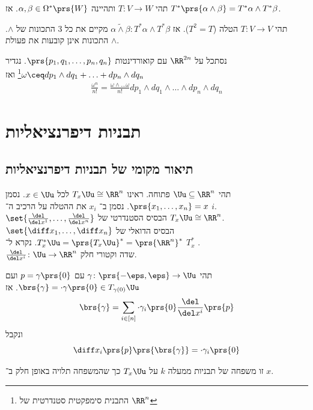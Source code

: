 \documentclass[a4paper,10pt,twoside,openany]{book}
\begin{document}
\begin{exercise}
תהי
$T \colon V \to W$
ותהיינה
$\alpha,\beta \in \Omega^*\prs{W}$.
אז
$T^*\prs{\alpha \wedge \beta} = T^*\alpha \wedge T^* \beta$.
\end{exercise}
\begin{example}
תהי
$T \colon V \to V$
הטלה ($T^2 = T$).
אז
$\alpha \tilde{\wedge} \beta \colon T^* \alpha \wedge T^* \beta$
מקיים את כל
$3$
התכונות של
$\wedge$.
התכונות אינן קובעות את פעולת
$\wedge$.
\end{example}
\begin{exercise}
נסתכל על
$\RR^{2n}$
עם קואורדינטות
$\prs{p_1, q_1, \ldots, p_n,q_n}$.
נגדיר
$\omega \ceq dp_1 \wedge dq_1+\ldots+dp_n\wedge dq_n$\footnote{התבנית סימפקטית סטנדרטית של
$\RR^n$}
ואז
\begin{align*}
\frac{\omega^n}{n!}  = \frac{\omega \wedge \ldots \omega}{n!} dp_1 \wedge dq_1 \wedge \ldots \wedge dp_n \wedge dq_n
\end{align*}
\end{exercise}

\section{תבניות דיפרנציאליות}
\subsection{תיאור מקומי של תבניות דיפרנציאליות}
\begin{notation}
תהי
$\Uu \subseteq \RR^n$
פתוחה. ראינו
$T_x \Uu \cong \RR^n$
לכל
$x \in \Uu$.
נסמן
$\prs{x_1, \ldots, x_n} = x$.
נסמן ב־%
$x_i$
את ההטלה על הרכיב ה־%
$i$.\\
$\set{\frac{\del}{\del x^1} , \ldots, \frac{\del}{\del x^n}}$
הבסיס הסטנדרטי של
$T_x\Uu \cong \RR^n$.\\
$\set{\diff x_1, \ldots, \diff x_n}$
הבסיס הדואלי של
$T_x^* \Uu = \prs{T_x \Uu}^* = \prs{\RR^n}^*$.
נקרא ל־%
$T_x^*$
.\\
$\frac{\del}{\del x^i} \colon \Uu \to \RR^n$
שדה וקטורי חלק.
\end{notation}

\begin{example}
תהי
$\gamma \colon \prs{-\eps,\eps} \to \Uu$
עם
$p=\gamma\prs{0}$
ועם
$\brs{\gamma} = \cdot{\gamma}\prs{0} \in T_{\gamma(0)}\Uu$.
אז
\[\brs{\gamma} = \sum_{i\in[n]} \cdot{\gamma}_i\prs{0} \frac{\del}{\del x^i}\prs{p}\]
ונקבל
\[\diff x_i \prs{p} \prs{\brs{\gamma}} = \cdot{\gamma_i} \prs{0}\]
\end{example}
\begin{definition}
זו משפחה של תבניות ממעלה
$k$
על
$T_x\Uu$
כך שהמשפחה תלויה באופן חלק ב־%
$x$.
\end{definition}
\end{document}

